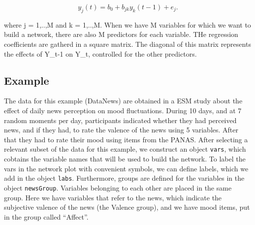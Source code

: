 \documentclass[man,floatsintext]{apa6}
\theoremstyle{definition}
\theoremstyle{definition}
\theoremstyle{definition}
\theoremstyle{remark}
\begin{document}
\begin{equation}
 y_j(t) = b_0 + b_{jk} y_k(t-1) + e_j.
\end{equation}

where j = 1,..,M and k = 1,..,M. When we have M variables for which we
want to build a network, there are also M predictors for each variable.
THe regression coefficients are gatherd in a square matrix. The diagonal
of this matrix represents the effects of Y\_t-1 on Y\_t, controlled for
the other predictors.

\subsection{Example}\label{example}

The data for this example (DataNews) are obtained in a ESM study about
the effect of daily news perception on mood fluctuations. During 10
days, and at 7 random moments per day, participants indicated whether
they had perceived news, and if they had, to rate the valence of the
news using 5 variables. After that they had to rate their mood using
items from the PANAS. After selecting a relevant subset of the data for
this example, we construct an object \texttt{vars}, which cobtains the
variable names that will be used to build the network. To label the vars
in the network plot with convenient symbols, we can define labels, which
we add in the object \texttt{labs}. Furthermore, groups are defined for
the variables in the object \texttt{newsGroup}. Variables belonging to
each other are placed in the same group. Here we have variables that
refer to the news, which indicate the subjective valence of the news
(the Valence group), and we have mood items, put in the group called
\enquote{Affect}.
\end{document}
